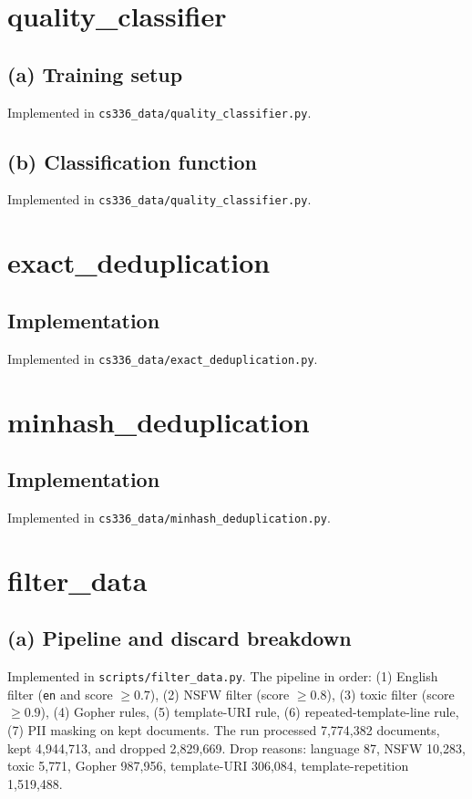 \documentclass[11pt]{article}
\newcommand{\answer}[1]{#1}
\begin{document}
\section{quality\_classifier}
\subsection*{(a) Training setup}
\answer{Implemented in \texttt{cs336\_data/quality\_classifier.py}.}

\subsection*{(b) Classification function}
\answer{Implemented in \texttt{cs336\_data/quality\_classifier.py}.}

\section{exact\_deduplication}
\subsection*{Implementation}
\answer{Implemented in \texttt{cs336\_data/exact\_deduplication.py}.}

\section{minhash\_deduplication}
\subsection*{Implementation}
\answer{Implemented in \texttt{cs336\_data/minhash\_deduplication.py}.}

\section{filter\_data}
\subsection*{(a) Pipeline and discard breakdown}
\answer{Implemented in \texttt{scripts/filter\_data.py}. The pipeline in order: (1) English filter (\texttt{en} and score \(\ge 0.7\)), (2) NSFW filter (score \(\ge 0.8\)), (3) toxic filter (score \(\ge 0.9\)), (4) Gopher rules, (5) template-URI rule, (6) repeated-template-line rule, (7) PII masking on kept documents. The run processed 7{,}774{,}382 documents, kept 4{,}944{,}713, and dropped 2{,}829{,}669. Drop reasons: language 87, NSFW 10{,}283, toxic 5{,}771, Gopher 987{,}956, template-URI 306{,}084, template-repetition 1{,}519{,}488.}
\end{document}
